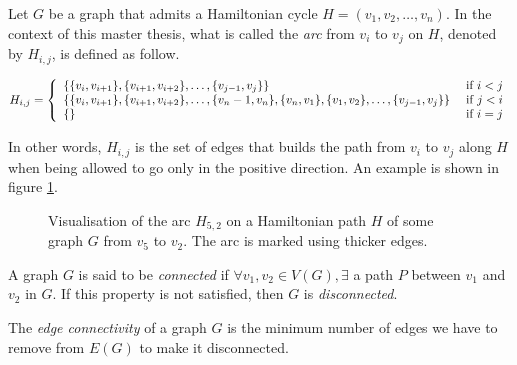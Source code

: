 \begin{definition}
    \label{def:arc}
    Let $G$ be a graph that admits a Hamiltonian cycle $H = (v_1, v_2, \dots, v_n)$. In the context of this master thesis, what is called the \textit{arc} from $v_i$ to $v_j$ on $H$, denoted by $H_{i, j}$, is defined as follow.
    
    \begin{center}
        $H_{i, j} = \left\{
        \begin{array}{l l}
            \left\{
                \{v_i, v_{i+1}\}, \{v_{i+1}, v_{i+2}\}, \dots, \{v_{j-1}, v_j\}
            \right\} & \mbox{ if } i < j \\
            \left\{
                \{v_i, v_{i+1}\}, \{v_{i+1}, v_{i+2}\}, \dots, \{v_n - 1, v_n\},  \{v_n, v_1\}, \{v_1, v_2\}, \dots, \{v_{j-1}, v_j\}
            \right\} & \mbox{ if } j < i \\
            \left\{\right\} & \mbox{ if } i = j
        \end{array}
        \right.$
    \end{center}
    
    In other words, $H_{i, j}$ is the set of edges that builds the path from $v_i$ to $v_j$ along $H$ when being allowed to go only in the positive direction. An example is shown in figure \ref{fig:H_i_j}.

    \begin{figure}[H]
        \caption{Visualisation of the arc $H_{5, 2}$ on a Hamiltonian path $H$ of some graph $G$ from $v_5$ to $v_2$. The arc is marked using thicker edges.}
        \label{fig:H_i_j}
    \end{figure}
    
\end{definition}

\begin{definition}
    \label{def:connected_graph}
    A graph $G$ is said to be \textit{connected} if $\forall v_1, v_2 \in V(G), \exists$ a path $P$ between $v_1$ and $v_2$ in $G$. If this property is not satisfied, then $G$ is \textit{disconnected}.
\end{definition}

\begin{definition}
    \label{def:edge_connectivity}
    The \textit{edge connectivity} of a graph $G$ is the minimum number of edges we have to remove from $E(G)$ to make it disconnected.
\end{definition}

